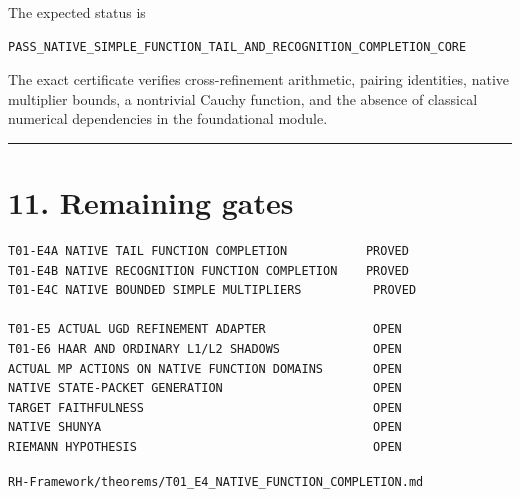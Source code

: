 The expected status is

\begin{verbatim}
PASS_NATIVE_SIMPLE_FUNCTION_TAIL_AND_RECOGNITION_COMPLETION_CORE
\end{verbatim}

The exact certificate verifies cross-refinement arithmetic, pairing identities,
native multiplier bounds, a nontrivial Cauchy function, and the absence of
classical numerical dependencies in the foundational module.

\begin{center}\rule{0.5\linewidth}{0.5pt}\end{center}

\hypertarget{remaining-gates}{%
\section{11. Remaining gates}\label{remaining-gates}}

\begin{verbatim}
T01-E4A NATIVE TAIL FUNCTION COMPLETION           PROVED
T01-E4B NATIVE RECOGNITION FUNCTION COMPLETION    PROVED
T01-E4C NATIVE BOUNDED SIMPLE MULTIPLIERS          PROVED

T01-E5 ACTUAL UGD REFINEMENT ADAPTER               OPEN
T01-E6 HAAR AND ORDINARY L1/L2 SHADOWS             OPEN
ACTUAL MP ACTIONS ON NATIVE FUNCTION DOMAINS       OPEN
NATIVE STATE-PACKET GENERATION                     OPEN
TARGET FAITHFULNESS                                OPEN
NATIVE SHUNYA                                      OPEN
RIEMANN HYPOTHESIS                                 OPEN
\end{verbatim}

\begin{flushright}\small\texttt{RH-Framework/theorems/T01\_E4\_NATIVE\_FUNCTION\_COMPLETION.md}\end{flushright}
